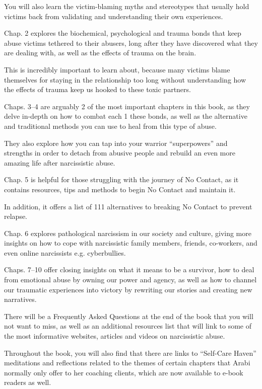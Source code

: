 \documentclass[oneside]{book}
\numberwithin{equation}{section}
\begin{document}
You will also learn the victim-blaming myths and stereotypes that usually hold victims back from validating and understanding their own experiences.

%
Chap. 2 explores the biochemical, psychological and trauma bonds that keep abuse victims tethered to their abusers, long after they have discovered what they are dealing with, as well as the effects of trauma on the brain.

This is incredibly important to learn about, because many victims blame themselves for staying in the relationship too long without understanding how the effects of trauma keep us hooked to these toxic partners.

%
Chaps. 3--4 are arguably 2 of the most important chapters in this book, as they delve in-depth on how to combat each 1 these bonds, as well as the alternative and traditional methods you can use to heal from this type of abuse.

They also explore how you can tap into your warrior ``superpowers'' and strengths in order to detach from abusive people and rebuild an even more amazing life after narcissistic abuse.

%
Chap. 5 is helpful for those struggling with the journey of No Contact, as it contains resources, tips and methods to begin No Contact and maintain it.

In addition, it offers a list of 111 alternatives to breaking No Contact to prevent relapse.

%
Chap. 6 explores pathological narcissism in our society and culture, giving more insights on how to cope with narcissistic family members, friends, co-workers, and even online narcissists e.g. cyberbullies.

Chaps. 7--10 offer closing insights on what it means to be a survivor, how to deal from emotional abuse by owning our power and agency, as well as how to channel our traumatic experiences into victory by rewriting our stories and creating new narratives.

%
There will be a Frequently Asked Questions at the end of the book that you will not want to miss, as well as an additional resources list that will link to some of the most informative websites, articles and videos on narcissistic abuse.

%
Throughout the book, you will also find that there are links to ``Self-Care Haven'' meditations and reflections related to the themes of certain chapters that Arabi normally only offer to her coaching clients, which are now available to e-book readers as well.
\end{document}
